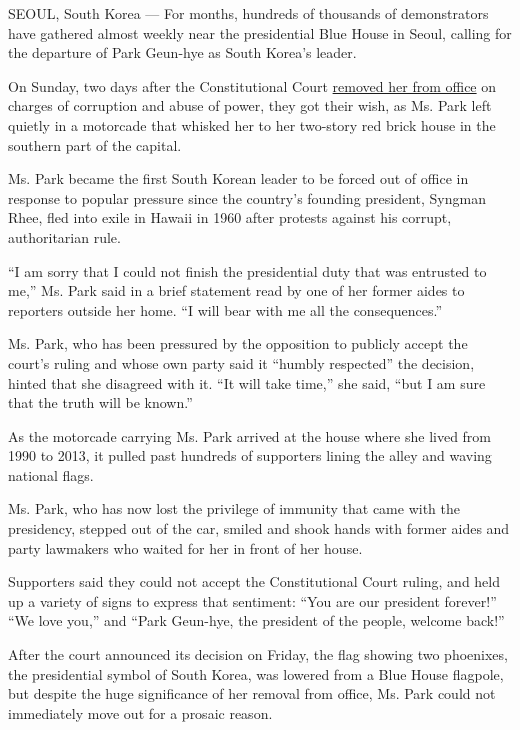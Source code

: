 SEOUL, South Korea --- For months, hundreds of thousands of
demonstrators have gathered almost weekly near the presidential Blue
House in Seoul, calling for the departure of Park Geun-hye as South
Korea's leader.

On Sunday, two days after the Constitutional Court
\href{https://www.nytimes.com/2017/03/09/world/asia/park-geun-hye-impeached-south-korea.html}{removed
her from office} on charges of corruption and abuse of power, they got
their wish, as Ms. Park left quietly in a motorcade that whisked her to
her two-story red brick house in the southern part of the capital.

Ms. Park became the first South Korean leader to be forced out of office
in response to popular pressure since the country's founding president,
Syngman Rhee, fled into exile in Hawaii in 1960 after protests against
his corrupt, authoritarian rule.

``I am sorry that I could not finish the presidential duty that was
entrusted to me,'' Ms. Park said in a brief statement read by one of her
former aides to reporters outside her home. ``I will bear with me all
the consequences.''

Ms. Park, who has been pressured by the opposition to publicly accept
the court's ruling and whose own party said it ``humbly respected'' the
decision, hinted that she disagreed with it. ``It will take time,'' she
said, ``but I am sure that the truth will be known.''

As the motorcade carrying Ms. Park arrived at the house where she lived
from 1990 to 2013, it pulled past hundreds of supporters lining the
alley and waving national flags.

Ms. Park, who has now lost the privilege of immunity that came with the
presidency, stepped out of the car, smiled and shook hands with former
aides and party lawmakers who waited for her in front of her house.

Supporters said they could not accept the Constitutional Court ruling,
and held up a variety of signs to express that sentiment: ``You are our
president forever!'' ``We love you,'' and ``Park Geun-hye, the president
of the people, welcome back!''

After the court announced its decision on Friday, the flag showing two
phoenixes, the presidential symbol of South Korea, was lowered from a
Blue House flagpole, but despite the huge significance of her removal
from office, Ms. Park could not immediately move out for a prosaic
reason.

